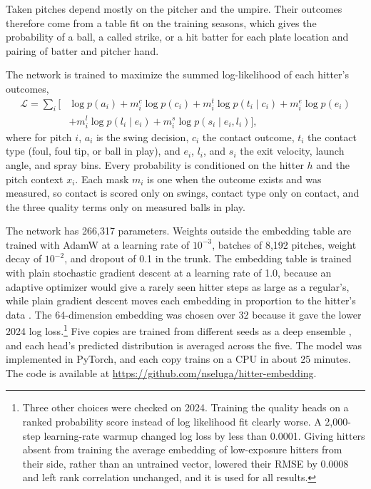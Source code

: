 Taken pitches depend mostly on the pitcher and the umpire. Their outcomes therefore come from a table fit on the training seasons, which gives the probability of a ball, a called strike, or a hit batter for each plate location and pairing of batter and pitcher hand.

The network is trained to maximize the summed log-likelihood of each hitter's outcomes,
\begin{equation}
\begin{split}
\mathcal{L} = \sum_{i} \Big[ & \log p(a_i) + m^{c}_i \log p(c_i) + m^{t}_i \log p(t_i \mid c_i) + m^{e}_i \log p(e_i) \\
& + m^{l}_i \log p(l_i \mid e_i) + m^{s}_i \log p(s_i \mid e_i, l_i) \Big],
\end{split}
\label{eq:loss}
\end{equation}
where for pitch $i$, $a_i$ is the swing decision, $c_i$ the contact outcome, $t_i$ the contact type (foul, foul tip, or ball in play), and $e_i$, $l_i$, and $s_i$ the exit velocity, launch angle, and spray bins. Every probability is conditioned on the hitter $h$ and the pitch context $x_i$. Each mask $m_i$ is one when the outcome exists and was measured, so contact is scored only on swings, contact type only on contact, and the three quality terms only on measured balls in play.

The network has 266,317 parameters. Weights outside the embedding table are trained with AdamW \citep{loshchilov2019} at a learning rate of $10^{-3}$, batches of 8,192 pitches, weight decay of $10^{-2}$, and dropout of 0.1 in the trunk. The embedding table is trained with plain stochastic gradient descent at a learning rate of 1.0, because an adaptive optimizer would give a rarely seen hitter steps as large as a regular's, while plain gradient descent moves each embedding in proportion to the hitter's data \citep{stollenwerk2025}. The 64-dimension embedding was chosen over 32 because it gave the lower 2024 log loss.\footnote{Three other choices were checked on 2024. Training the quality heads on a ranked probability score instead of log likelihood fit clearly worse. A 2,000-step learning-rate warmup changed log loss by less than 0.0001. Giving hitters absent from training the average embedding of low-exposure hitters from their side, rather than an untrained vector, lowered their RMSE by 0.0008 and left rank correlation unchanged, and it is used for all results.} Five copies are trained from different seeds as a deep ensemble \citep{lakshminarayanan2017}, and each head's predicted distribution is averaged across the five. The model was implemented in PyTorch, and each copy trains on a CPU in about 25 minutes. The code is available at \url{https://github.com/nseluga/hitter-embedding}.

